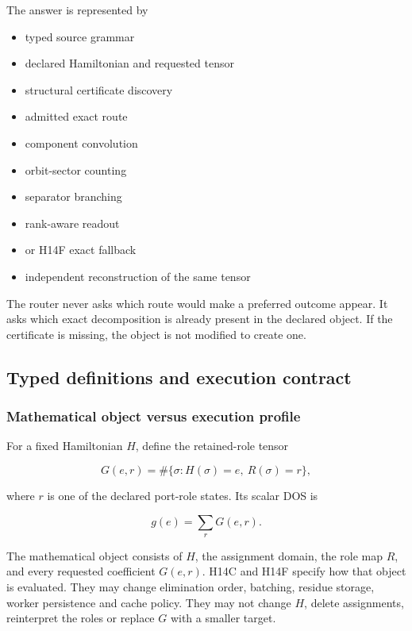 The answer is represented by

\begin{itemize}
\tightlist
\item
  typed source grammar
\item
  declared Hamiltonian and requested tensor
\item
  structural certificate discovery
\item
  admitted exact route
\item
  component convolution
\item
  orbit-sector counting
\item
  separator branching
\item
  rank-aware readout
\item
  or H14F exact fallback
\item
  independent reconstruction of the same tensor
\end{itemize}

The router never asks which route would make a preferred outcome appear.
It asks which exact decomposition is already present in the declared
object. If the certificate is missing, the object is not modified to
create one.

\subsection{Typed definitions and execution
contract}\label{viii-ch01-typed-definitions-and-execution-contract}

\subsubsection{Mathematical object versus execution
profile}\label{viii-ch01-mathematical-object-versus-execution-profile}

For a fixed Hamiltonian \(H\), define the retained-role tensor

\[
G(e,r)=\#\{\sigma:H(\sigma)=e,\ R(\sigma)=r\},
\]

where \(r\) is one of the declared port-role states. Its scalar DOS is

\[
g(e)=\sum_rG(e,r).
\]

The mathematical object consists of \(H\), the assignment domain, the
role map \(R\), and every requested coefficient \(G(e,r)\). H14C and
H14F specify how that object is evaluated. They may change elimination
order, batching, residue storage, worker persistence and cache policy.
They may not change \(H\), delete assignments, reinterpret the roles or
replace \(G\) with a smaller target.


